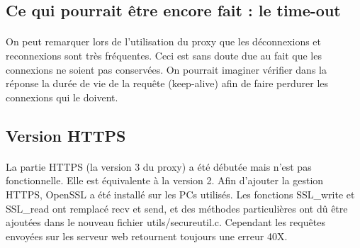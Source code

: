 \subsection{Ce qui pourrait être encore fait : le time-out}
\paragraph{}
On peut remarquer lors de l'utilisation du proxy que les déconnexions et reconnexions sont très fréquentes. Ceci est sans doute due au fait que les connexions ne soient pas conservées. On pourrait imaginer vérifier dans la réponse la durée de vie de la requête (keep-alive) afin de faire perdurer les connexions qui le doivent. 

\subsection{Version HTTPS}
\paragraph{}
La partie HTTPS (la version 3 du proxy) a été débutée mais n'est pas fonctionnelle. Elle est équivalente à la version 2.
Afin d'ajouter la gestion HTTPS, OpenSSL a été installé sur les PCs utilisés. Les fonctions SSL\_write et SSL\_read ont remplacé recv et send, et des méthodes particulières ont dû être ajoutées dans le nouveau fichier utils/secureutil.c. 
Cependant les requêtes envoyées sur les serveur web retournent toujours une erreur 40X. 